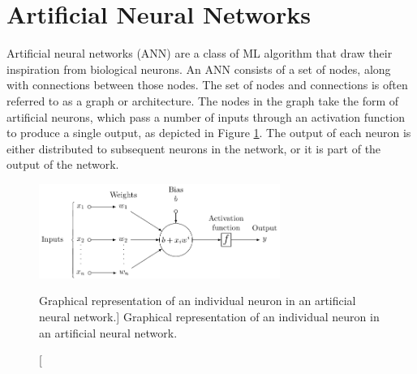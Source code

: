 \section{Artificial Neural Networks}
Artificial neural networks (ANN) are a class of ML algorithm that draw their
inspiration from biological neurons. An ANN consists of a set of nodes, along
with connections between those nodes. The set of nodes and connections is 
often referred to as a graph or architecture. The nodes in the graph take the 
form of artificial neurons, which pass a number of inputs through an 
activation function to produce a single output, as depicted in Figure 
\ref{fig:neuron}.  The output of each neuron is either distributed to 
subsequent neurons in the network, or it is part of the output of the network. 
\begin{figure}

	\centering

	\includegraphics[width = 0.7\textwidth]{figures/neuron.pdf}

	\caption
	[Graphical representation of an individual neuron in an artificial neural
	network.]
	{Graphical representation of an individual neuron in an artificial neural
	network.}

	\label{fig:neuron}

\end{figure}

